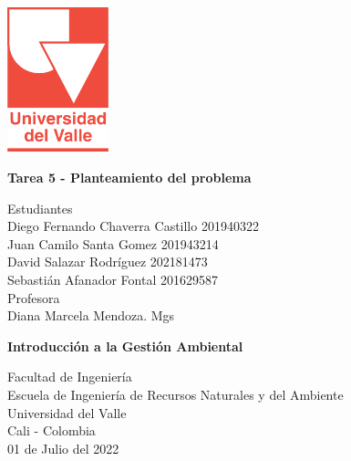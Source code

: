 \begin{titlepage}
    \begin{center}
        \vspace*{1cm}

        \begin{Huge}
        \end{Huge}

        \includegraphics[width=0.22\textwidth]{img/universidadDelValle.png}
        
        \vfill
        \textbf{Tarea 5 - Planteamiento del problema}\\
        \vfill
        
        Estudiantes\\
        Diego Fernando Chaverra Castillo 201940322\\
        Juan Camilo Santa Gomez 201943214\\
        David Salazar Rodríguez 202181473\\
        Sebastián Afanador Fontal 201629587\\
        \vfill
        Profesora\\
        Diana Marcela Mendoza. Mgs
        
        
        \vfill

        \textbf{Introducción a la Gestión Ambiental}
        
        \vfill
           
        Facultad de Ingeniería\\
        Escuela de Ingeniería de Recursos Naturales y del Ambiente\\
        Universidad del Valle\\
        Cali - Colombia\\
        \vfill
        01 de Julio del 2022

    \end{center}
\end{titlepage}